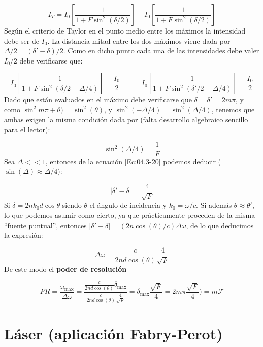 \documentclass[12pt,a4paper]{book}
\numberwithin{equation}{section}
\numberwithin{figure}{section}
\newcommand{\tquad}{\quad \quad \quad}
\newcommand{\parentesis}[1]{\left( #1  \right)}
\newcommand{\ccorchetes}[1]{\left[ #1  \right]}
\newcommand{\1}{_{(1)}}
\newcommand{\2}{_{(2)}}
\theoremstyle{definition}
\begin{document}
\begin{equation}
I_T = I_0 \ccorchetes{\frac{1}{1+F\sin^2(\delta/2)}} + I_0 \ccorchetes{\frac{1}{1+F\sin^2(\delta/2)}}
\end{equation}
Según el criterio de Taylor en el punto medio entre los máximos la intensidad debe ser de $I_0$. La distancia mitad entre los dos máximos viene dada por $\Delta/2=(\delta'-\delta)/2$. Como en dicho punto cada una de las intensidades debe valer $I_0/2$ debe verificarse que:

$$ I_0 \ccorchetes{\frac{1}{1+F\sin^2(\delta/2+\Delta/4)}} = \frac{I_0}{2} \tquad I_0 \ccorchetes{\frac{1}{1+F\sin^2 \parentesis{\delta'/2-\Delta/4}}} = \frac{I_0}{2} $$
Dado que están evaluados en el máximo debe verificarse que $\delta=\delta'=2m\pi$, y como $\sin^2m\pi+\theta) = \sin^2(\theta)$, y $\sin^2(-\Delta/4) = \sin^2(\Delta/4)$, tenemos que ambas exigen la misma condición dada por (falta desarrollo algebraico sencillo para el lector):

\begin{equation}
\sin^2(\Delta /4) = \frac{1}{F} \label{Ec:04.3-20}
\end{equation}
Sea $\Delta<<1$, entonces de la ecuación \ref{Ec:04.3-20} podemos deducir ($\sin (\Delta) \approx \Delta/4$):

\begin{equation}
|\delta'-\delta|=\frac{4}{\sqrt{F}}
\end{equation}
Si $\delta=2nk_0d\cos \theta$ siendo $\theta$ el ángulo de incidencia y $k_0=\omega/c$. Si además $\theta \approx \theta'$, lo que podemos asumir como cierto, ya que prácticamente proceden de la misma ``fuente puntual'', entonces $|\delta'-\delta|= (2n\cos(\theta)/c)\Delta\omega$, de lo que deducimos la expresión:


\begin{equation}
\Delta \omega = \frac{c}{2nd\cos (\theta)} \frac{4}{\sqrt{F}}
\end{equation}
De este modo el \textbf{poder de resolución}

\begin{equation}
PR = \frac{\omega_{\max}}{\Delta \omega} = \frac{\frac{c}{2nd\cos(\theta)} \delta_{\max}}{\frac{c}{2nd \cos (\theta)} \frac{4}{\sqrt{F}}} = \delta_{\max} \frac{\sqrt{F}}{4} = 2m\pi \frac{\sqrt{F}}{4} )= m \mathcal{F}
\end{equation}
\hrulefill


\section{Láser (aplicación Fabry-Perot)}
\end{document}

